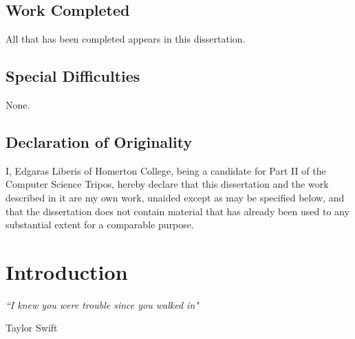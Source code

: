 \documentclass[12pt,british,twoside,notitlepage,usenames,dvipsnames,hypens,final]{report}
\numberwithin{equation}{section}
\numberwithin{figure}{section}
\newcommand*\circled[1]{\tikz[baseline=(char.base)]{
            \node[shape=circle,draw,inner sep=2pt] (char) {#1};}}
\begin{document}
\section*{Work Completed}

All that has been completed appears in this dissertation.

\section*{Special Difficulties}

None.

\cleardoublepage

\section*{Declaration of Originality}
I, Edgaras Liberis of Homerton College, being a candidate for Part II of the Computer Science Tripos, hereby declare that this dissertation and the work described in it are my own work, unaided except as may be specified below, and that the dissertation does not contain material that has already been used to any substantial extent for a comparable purpose.

\bigskip
{}

\medskip
{}

\cleardoublepage

\setcounter{page}{1}
\pagestyle{headings}

\chapter*{\scalebox{2}{\circled{1}} \:\: Introduction \hfill}
\epigraph{\emph{``I knew you were trouble since you walked in"}}{Taylor Swift}
\end{document}

